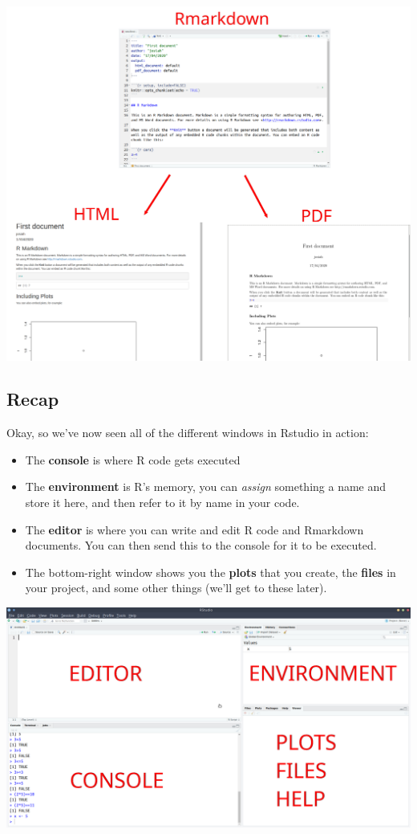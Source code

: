 \documentclass[]{book}
\providecommand{\tightlist}{%
  \setlength{\itemsep}{0pt}\setlength{\parskip}{0pt}}
\begin{document}
\includegraphics{images/installing_intro/compiling.png}

\hypertarget{recap}{%
\subsection*{Recap}\label{recap}}

Okay, so we've now seen all of the different windows in Rstudio in action:

\begin{itemize}
\tightlist
\item
  The \textbf{console} is where R code gets executed
\item
  The \textbf{environment} is R's memory, you can \emph{assign} something a name and store it here, and then refer to it by name in your code.
\item
  The \textbf{editor} is where you can write and edit R code and Rmarkdown documents. You can then send this to the console for it to be executed.
\item
  The bottom-right window shows you the \textbf{plots} that you create, the \textbf{files} in your project, and some other things (we'll get to these later).
\end{itemize}

\includegraphics{images/installing_intro/r4panel3.png}
\end{document}
